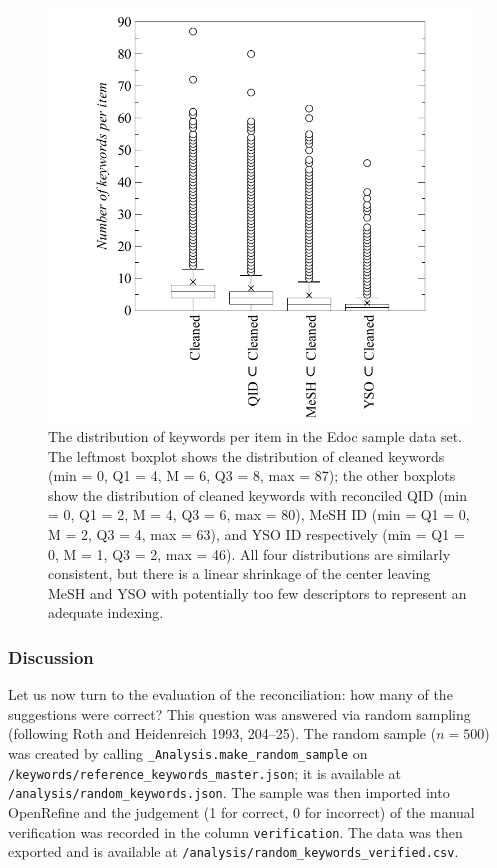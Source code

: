 \begin{figure}
\centering
\includegraphics{images/keywords_counted.pdf}
\caption{The distribution of keywords per item in the Edoc sample data
set. The leftmost boxplot shows the distribution of cleaned keywords
(min = 0, Q1 = 4, M = 6, Q3 = 8, max = 87); the other boxplots show the
distribution of cleaned keywords with reconciled QID (min = 0, Q1 = 2, M
= 4, Q3 = 6, max = 80), MeSH ID (min = Q1 = 0, M = 2, Q3 = 4, max = 63),
and YSO ID respectively (min = Q1 = 0, M = 1, Q3 = 2, max = 46). All
four distributions are similarly consistent, but there is a linear
shrinkage of the center leaving MeSH and YSO with potentially too few
descriptors to represent an adequate indexing.}
\end{figure}

\hypertarget{discussion}{%
\subsubsection{Discussion}\label{discussion}}

Let us now turn to the evaluation of the reconciliation: how many of the
suggestions were correct? This question was answered via random sampling
(following Roth and Heidenreich 1993, 204--25). The random sample
(\(n=500\)) was created by calling
\texttt{\_Analysis.make\_random\_sample} on
\texttt{/keywords/reference\_keywords\_master.json}; it is available at
\texttt{/analysis/random\_keywords.json}. The sample was then imported
into OpenRefine and the judgement (1 for correct, 0 for incorrect) of
the manual verification was recorded in the column
\texttt{verification}. The data was then exported and is available at
\texttt{/analysis/random\_keywords\_verified.csv}.

